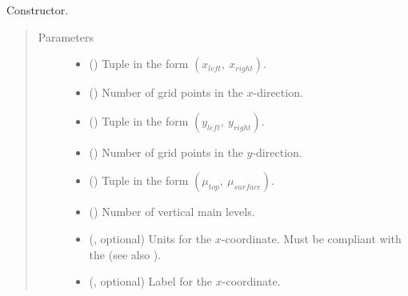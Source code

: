 \documentclass[letterpaper,10pt,english]{sphinxmanual}
\begin{document}
\begin{fulllineitems}
\begin{fulllineitems}
\label{\detokenize{api:grids.gal_chen.GalChen3d.__init__}}
Constructor.
\begin{quote}\begin{description}
\item[{Parameters}] \leavevmode\begin{itemize}
\item {} 
 () \textendash{} Tuple in the form \((x_{left}, ~ x_{right})\).

\item {} 
 () \textendash{} Number of grid points in the \(x\)-direction.

\item {} 
 () \textendash{} Tuple in the form \((y_{left}, ~ y_{right})\).

\item {} 
 () \textendash{} Number of grid points in the \(y\)-direction.

\item {} 
 () \textendash{} Tuple in the form \((\mu_{top}, ~ \mu_{surface})\).

\item {} 
 () \textendash{} Number of vertical main levels.

\item {} 
 (, optional) \textendash{} 
Units for the \(x\)-coordinate. Must be compliant with the 
(see also {\hyperref[\detokenize{api:grids.axis.Axis.__init__}]{}}).


\item {} 
 (, optional) \textendash{} Label for the \(x\)-coordinate.


\end{itemize}
\end{description}
\end{quote}
\end{fulllineitems}
\end{fulllineitems}
\end{document}
